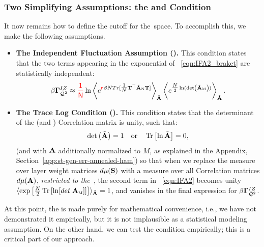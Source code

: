 \subsubsection{Two Simplifying Assumptions: the \IFA and \TRACELOG Condition}
\label{sxn:matgen_quality_hciz_C}

It now remains how to define the cutoff for the~\ECS space. To accomplish this, we make the following assumptions.
\begin{itemize}
\item
\textbf{The Independent Fluctuation Assumption (\IFA).}
This condition states that the two terms appearing in the exponential of \EQN~\ref{eqn:IFA2_braket} are statistically independent:
\begin{align}
  \label{eqn:IFA2}
  \beta\mathbf{\Gamma}^{IZ}_{\bar{\mathcal{Q}}^{2}} \approx 
    {\color{red}\sf{\frac{1}{N}}}
\ln
  \left\langle
  e^{{\color{red}\sf{n}}\beta N Tr[ \tfrac{1}{N}{\mathbf{T}}^{\top}\tilde{\mathbf{A}}_{\text{\tiny N}}{\mathbf{T}}] }
  \right\rangle_{\tilde{\mathbf{A}}}
  \left\langle
  e^{\tfrac{N}{2}\ln(\mbox{}{\text{det}}\left(\tilde{\mathbf{A}}_{\text{\tiny M}}\right))}
    \right\rangle_{\tilde{\mathbf{A}}}.
\end{align}
\item
\textbf{The Trace Log Condition (\TRACELOG).}
This condition states that the determinant of the \Student (and \Teacher) Correlation matrix is unity, such that:
\begin{align}
\label{eqn:tlc_mm}
\mbox{}{\text{det}}\left(\tilde{\mathbf{A}}\right)=1 
\quad\mbox{or}\quad
\mbox{}\operatorname{Tr}\left[\ln \tilde{\mathbf{A}}\right]=0  ,
\end{align}
(and with $\mathbf{A}$ additionally normalized to $M$, as explained in the Appendix, Section~\ref{app:st-gen-err-annealed-ham})
so that when we replace the measure over \Student layer weight matrices $d\mu({\mathbf{S}})$ with a measure over all \Student Correlation matrices $d\mu(\mathbf{A})$,
\emph{restricted to the~\ECS}, the second term in \EQN~\ref{eqn:IFA2} becomes unity
$\langle \exp\left[\tfrac{N}{2} \mbox{}\operatorname{Tr}\left[ \ln[det\;{\mathbf{A}}_{\text{\tiny M}}] \right] \right]\rangle_{\tilde{\mathbf{A}}}=1$,
and vanishes in the final expression for $\beta\mathbf{\Gamma}^{IZ}_{\bar{\mathcal{Q}}^{2}}$.
\end{itemize}

\noindent
At this point, the \IFA is made purely for mathematical convenience, i.e., 
we have not demonstrated it empirically, but it is not implausible as a statistical modeling assumption. 
On the other hand, we can test the \TRACELOG condition empirically;
this is a critical part of our \SETOL approach.


